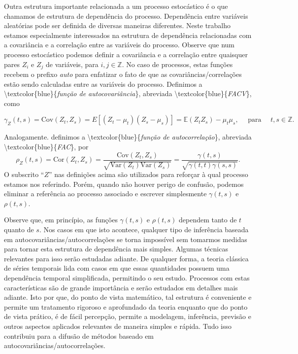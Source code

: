 \documentclass[
]{book}
\theoremstyle{definition}
\theoremstyle{definition}
\theoremstyle{definition}
\theoremstyle{remark}
\begin{document}
Outra estrutura importante relacionada a um processo estocástico é o que chamamos de estrutura de dependência do processo. Dependência entre variáveis aleatórias pode ser definida de diversas maneiras diferentes. Neste trabalho estamos especialmente interessados na estrutura de dependência relacionadas com a covariância e a correlação entre as variáveis do processo. Observe que num processo estocástico podemos definir a covariância e a correlação entre quaisquer pares \(Z_i\) e \(Z_j\) de variáveis, para \(i,j\in\mathbb{Z}\). No caso de processos, estas funções recebem o prefixo \emph{auto} para enfatizar o fato de que as covariâncias/correlações estão sendo calculadas entre as variáveis do processo. Definimos a
\textbackslash textcolor\{blue\}\{\emph{função de autocovariância}\}, abreviada \textbackslash textcolor\{blue\}\{\emph{FACV}\}, como

\begin{equation}
\gamma_Z(t,s) = \mbox{Cov}(Z_t , Z_s ) = E [(Z_t-\mu_t ) (Z_s-\mu_s )]=\mathbb{E} (Z_t Z_s ) - \mu_t \mu_s,\quad \mbox{ para }\quad t, s \in\mathbb{Z}.
\label{eq:funcacov}
\end{equation}

Analogamente. definimos a \textbackslash textcolor\{blue\}\{\emph{função de autocorrelação}\}, abreviada \textbackslash textcolor\{blue\}\{\emph{FAC}\}, por
\begin{equation}
\rho_Z(t,s) = \mbox{Cor}(Z_t , Z_s ) =\frac{\mbox{Cov}(Z_t , Z_s )}{\sqrt{\mbox{Var}(Z_t)\mbox{Var}(Z_s)}} = \frac{\gamma(t,s)}{\sqrt{\gamma(t,t)\gamma(s,s)}}.
\label{eq:funcfac}
\end{equation}
O subscrito ``\(Z\)'' nas definições acima são utilizados para reforçar à qual processo estamos nos referindo. Porém, quando não houver perigo de confusão, podemos eliminar a referência ao processo associado e escrever simplesmente \(\gamma(t,s)\) e \(\rho(t,s)\).

Observe que, em princípio, as funções \(\gamma(t,s)\) e \(\rho(t,s)\) dependem tanto de \(t\) quanto de \(s\). Nos casos em que isto acontece, qualquer tipo de inferência baseada em autocovariâncias/autocorrelações se torna impossível sem tomarmos medidas para tornar esta estrutura de dependência mais simples. Algumas técnicas relevantes para isso serão estudadas adiante. De qualquer forma, a teoria clássica de séries temporais lida com casos em que essas quantidades possuem uma dependência temporal simplificada, permitindo o seu estudo. Processos com estas características são de grande importância e serão estudados em detalhes mais adiante. Isto por que, do ponto de vista matemático, tal estrutura é conveniente e permite um tratamento rigoroso e aprofundado da teoria enquanto que do ponto de vista prático, é de fácil percepção, permite a modelagem, inferência, previsão e outros aspectos aplicados relevantes de maneira simples e rápida. Tudo isso contribuiu para a difusão de métodos baseado em autocovariâncias/autocorrelações.
\end{document}
